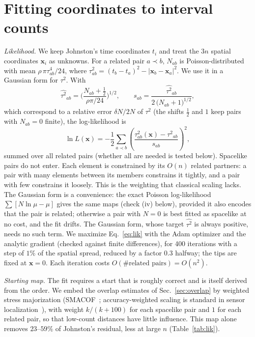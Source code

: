 \documentclass[prd,twocolumn,superscriptaddress,nofootinbib,amsmath,amssymb,floatfix]{revtex4-2}
\begin{document}
\section{Fitting coordinates to interval counts}\label{sec:likelihood}
\emph{Likelihood.} We keep Johnston's time coordinates $t_i$ and treat the $3n$ spatial coordinates $\mathbf x_i$ as unknowns. For a related pair $a\prec b$, $N_{ab}$ is Poisson-distributed with mean $\rho\,\pi\tau_{ab}^4/24$, where $\tau_{ab}^2=(t_b-t_a)^2-|\mathbf x_b-\mathbf x_a|^2$. We use it in a Gaussian form for $\tau^2$. With
\begin{equation}
\widehat{\tau^2}_{ab}=\Big(\frac{N_{ab}+\tfrac12}{\rho\pi/24}\Big)^{1/2},\qquad s_{ab}=\frac{\widehat{\tau^2}_{ab}}{2\,\big(N_{ab}+1\big)^{1/2}},
\end{equation}
which correspond to a relative error $\delta N/2N$ of $\tau^2$ (the shifts $\tfrac12$ and $1$ keep pairs with $N_{ab}=0$ finite), the log-likelihood is
\begin{equation}
\ln L(\mathbf x)=-\frac12\sum_{a\prec b}\left(\frac{\tau^2_{ab}(\mathbf x)-\widehat{\tau^2}_{ab}}{s_{ab}}\right)^{2},
\label{eq:lik}
\end{equation}
summed over all related pairs (whether all are needed is tested below). Spacelike pairs do not enter. Each element is constrained by its $O(n)$ related partners: a pair with many elements between its members constrains it tightly, and a pair with few constrains it loosely. This is the weighting that classical scaling lacks. The Gaussian form is a convenience: the exact Poisson log-likelihood $\sum[N\ln\mu-\mu]$ gives the same maps (check (iv) below), provided it also encodes that the pair is related; otherwise a pair with $N=0$ is best fitted as spacelike at no cost, and the fit drifts. The Gaussian form, whose target $\widehat{\tau^2}$ is always positive, needs no such term. We maximize Eq.~\eqref{eq:lik} with the Adam optimizer and the analytic gradient (checked against finite differences), for 400 iterations with a step of $1\%$ of the spatial spread, reduced by a factor $0.3$ halfway; the tips are fixed at $\mathbf x=0$. Each iteration costs $O(\#\text{related pairs})=O(n^2)$.

\emph{Starting map.} The fit requires a start that is roughly correct and is itself derived from the order. We embed the overlap estimates of Sec.~\ref{sec:overlap} by weighted stress majorization (SMACOF~\cite{deLeeuwMair09}; accuracy-weighted scaling is standard in sensor localization~\cite{CostaPatwariHero06}), with weight $k/(k+100)$ for each spacelike pair and $1$ for each related pair, so that low-count distances have little influence. This map alone removes $23$--$59\%$ of Johnston's residual, less at large $n$ (Table~\ref{tab:lik}).
\end{document}
